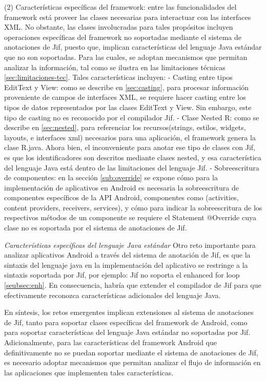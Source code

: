 (2) Características específicas del framework: entre las funcionalidades del
framework está proveer las clases necesarias para interactuar con las interfaces
XML. No obstante, las clases involucradas para tales propósitos incluyen
operaciones específicas del framework no soportadas mediante el sistema de
anotaciones de Jif, puesto que, implican características del lenguaje Java
estándar que no son soportadas. Para las cuales, se adoptan mecanismos que
permitan analizar la información, tal como se ilustra en las limitaciones
técnicas \ref{sec:limitaciones-tec}. Tales características incluyen:\newline 
- Casting entre tipos EditText y View: como se describe en
\ref{sec:casting}, para procesar información proveniente de campos de interfaces XML, se requiere
hacer casting entre los tipos de datos representados por las clases EditText y
View. Sin embargo, este tipo de casting no es reconocido por el compilador
Jif.\newline 
- Clase Nested R: como se describe en \ref{sec:nested}, para referenciar los
recursos(strings, estilos, widgets, layouts, e interfaces xml) necesarios para
una aplicación, el framework genera la clase R.java. Ahora bien, el
inconveniente para anotar ese tipo de clases con Jif, es que los identificadores
son descritos mediante clases nested, y esa característica del lenguaje Java
está dentro de las limitaciones del lenguaje Jif.\newline 
- Sobreescritura de componentes: en la sección \ref{sub:override} se expone
cómo para la implementación de aplicativos en Android es necesaria la
sobreescritura de componentes específicos de la API Android, componentes como
(activities, content providers, receivers, services), y cómo para indicar la
sobreescritura de los respectivos métodos de un componente se requiere el
Statement @Override cuya clase no es soportada por el sistema de anotaciones de
Jif.

\newpage
\emph{Características específicas del lenguaje Java estándar}\newline
Otro reto importante para analizar aplicativos Android a través del sistema de
anotación de Jif, es que la sintaxis del lenguaje java en la implementación del
aplicativo se restringe a la sintaxis soportada por Jif, por ejemplo: Jif no
soporta el enhanced for loop \ref{seubsec:enh}. En consecuencia, habría que
extender el compilador de Jif para que efectivamente reconozca características
adicionales del lenguaje Java.

En síntesis, los retos emergentes implican extensiones al sistema de
anotaciones de Jif, tanto para soportar clases específicas del framework de
Android, como para soportar características del lenguaje Java estándar no
soportadas por Jif.\newline
Adicionalmente, para las características del framework Android que
definitivamente no se puedan soportar mediante el sistema de anotaciones de Jif,
es necesario adoptar mecanismos que permitan analizar el flujo de información en
las aplicaciones que implementen tales características.\newline

